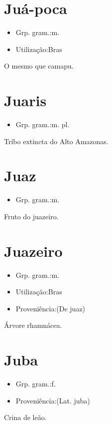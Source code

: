 \documentclass{article}
\begin{document}
\section{Juá-poca}
\begin{itemize}
\item {Grp. gram.:m.}
\end{itemize}
\begin{itemize}
\item {Utilização:Bras}
\end{itemize}
O mesmo que \textunderscore camapu\textunderscore .
\section{Juaris}
\begin{itemize}
\item {Grp. gram.:m. pl.}
\end{itemize}
Tríbo extincta do Alto Amazonas.
\section{Juaz}
\begin{itemize}
\item {Grp. gram.:m.}
\end{itemize}
Fruto do juazeiro.
\section{Juazeiro}
\begin{itemize}
\item {Grp. gram.:m.}
\end{itemize}
\begin{itemize}
\item {Utilização:Bras}
\end{itemize}
\begin{itemize}
\item {Proveniência:(De \textunderscore juaz\textunderscore )}
\end{itemize}
Árvore rhamnácea.
\section{Juba}
\begin{itemize}
\item {Grp. gram.:f.}
\end{itemize}
\begin{itemize}
\item {Proveniência:(Lat. \textunderscore juba\textunderscore )}
\end{itemize}
Crina de leão.
\end{document}
